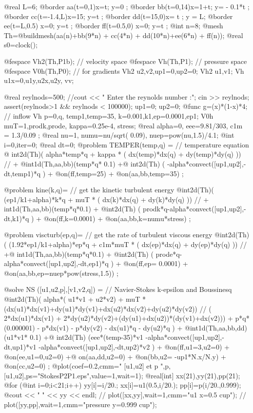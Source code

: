 \documentclass[a4paper,twoside,12pt]{book}
\begin{document}
\bFF
@real L=6;
@border aa(t=0,1){x=t; y=0 ;}
@border bb(t=0,14){x=1+t; y= - 0.1*t ;}
@border cc(t=-1.4,L){x=15; y=t ;}
@border dd(t=15,0){x= t ; y = L;}
@border ee(t=L,0.5){ x=0; y=t ;}
@border ff(t=0.5,0){ x=0; y=t ;}
@int n=8;
@mesh Th=@buildmesh(aa(n)+bb(9*n) + cc(4*n) + dd(10*n)+ee(6*n) + ff(n));
@real s0=clock();

@fespace Vh2(Th,P1b); // velocity space
@fespace Vh(Th,P1); // pressure space
@fespace V0h(Th,P0); // for gradients
Vh2 u2,v2,up1=0,up2=0;
Vh2 u1,v1;
Vh  u1x=0,u1y,u2x,u2y, vv;

@real reylnods=500;
//cout << " Enter the reynolds number :"; cin >> reylnods;
assert(reylnods>1 && reylnods < 100000);
up1=0;
up2=0;
@func g=(x)*(1-x)*4;  // inflow
Vh p=0,q, temp1,temp=35, k=0.001,k1,ep=0.0001,ep1;
V0h muT=1,prodk,prode, kappa=0.25e-4, stress;
@real alpha=0, eee=9.81/303, c1m = 1.3/0.09 ;
@real  nu=1, numu=nu/sqrt( 0.09), nuep=pow(nu,1.5)/4.1;
@int i=0,iter=0;
@real dt=0;
@problem TEMPER(temp,q) = // temperature equation
   @ int2d(Th)(
             alpha*temp*q + kappa * ( dx(temp)*dx(q) + dy(temp)*dy(q) ))
//   + @int1d(Th,aa,bb)(temp*q* 0.1)
  +@ int2d(Th) ( -alpha*convect([up1,up2],-dt,temp1)*q )
   + @on(ff,temp=25)
  + @on(aa,bb,temp=35) ;

@problem kine(k,q)=  // get the kinetic turbulent energy
    @int2d(Th)(
             (ep1/k1+alpha)*k*q + muT * ( dx(k)*dx(q) + dy(k)*dy(q) ))
//   + int1d(Th,aa,bb)(temp*q*0.1)
  + @int2d(Th) ( prodk*q-alpha*convect([up1,up2],-dt,k1)*q )
   + @on(ff,k=0.0001)  + @on(aa,bb,k=numu*stress) ;

 @problem viscturb(ep,q)= // get the rate of turbulent viscous energy
    @int2d(Th)(
             (1.92*ep1/k1+alpha)*ep*q + c1m*muT * ( dx(ep)*dx(q) + dy(ep)*dy(q) ))
//   +@ int1d(Th,aa,bb)(temp*q*0.1)
  + @int2d(Th) ( prode*q-alpha*convect([up1,up2],-dt,ep1)*q )
   + @on(ff,ep= 0.0001) + @on(aa,bb,ep=nuep*pow(stress,1.5)) ;


 @solve NS ([u1,u2,p],[v1,v2,q]) = // Navier-Stokes k-epsilon and Boussinesq
    @int2d(Th)(
             alpha*( u1*v1 + u2*v2)
            + muT * (dx(u1)*dx(v1)+dy(u1)*dy(v1)+dx(u2)*dx(v2)+dy(u2)*dy(v2))
 //           ( 2*dx(u1)*dx(v1) + 2*dy(u2)*dy(v2)+(dy(u1)+dx(u2))*(dy(v1)+dx(v2)))
            + p*q*(0.000001)
            - p*dx(v1) - p*dy(v2)
            - dx(u1)*q - dy(u2)*q
           )
  + @int1d(Th,aa,bb,dd)(u1*v1* 0.1)
  +@ int2d(Th) (eee*(temp-35)*v1 -alpha*convect([up1,up2],-dt,up1)*v1
                             -alpha*convect([up1,up2],-dt,up2)*v2 )
   + @on(ff,u1=3,u2=0)
  + @on(ee,u1=0,u2=0)
  +@ on(aa,dd,u2=0)
  + @on(bb,u2= -up1*N.x/N.y)
  + @on(cc,u2=0) ;
 @plot(coef=0.2,cmm=" [u1,u2] et p  ",p,[u1,u2],ps="StokesP2P1.eps",value=1,wait=1);
{
  @real[int] xx(21),yy(21),pp(21);
  @for (@int i=0;i<21;i++)
   {
     yy[i]=i/20.;
     xx[i]=u1(0.5,i/20.);
     pp[i]=p(i/20.,0.999);
    }
      @cout << " " << yy << endl;
//     plot([xx,yy],wait=1,cmm="u1 x=0.5 cup");
//     plot([yy,pp],wait=1,cmm="pressure y=0.999 cup");
}
\end{document}
